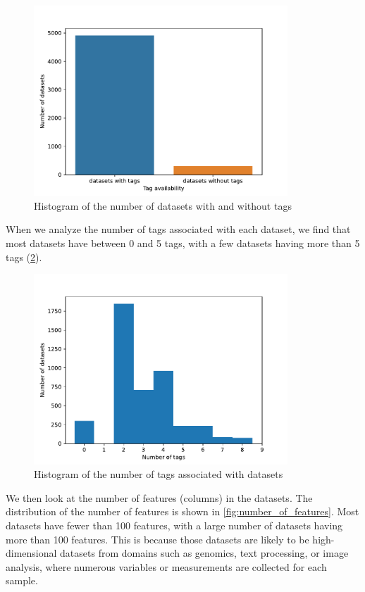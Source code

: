 \begin{figure}[h]
    \centering
    \includegraphics[width=0.85\textwidth]{figures/tag_availability.pdf}
    \caption{Histogram of the number of datasets with and without tags}
    \label{fig:tag_availability}
\end{figure}

When we analyze the number of tags associated with each dataset, we find that most datasets have between 0 and 5 tags, with a few datasets having more than 5 tags (\cref{fig:number_of_tags}).

\begin{figure}[h]
    \centering
    \includegraphics[width=0.85\textwidth]{figures/number_of_tags.pdf}
    \caption{Histogram of the number of tags associated with datasets}
    \label{fig:number_of_tags}
\end{figure}

We then look at the number of features (columns) in the datasets. The distribution of the number of features is shown in \cref{fig:number_of_features}. Most datasets have fewer than 100 features, with a large number of datasets having more than 100 features. This is because those datasets are likely to be high-dimensional datasets from domains such as genomics, text processing, or image analysis, where numerous variables or measurements are collected for each sample.

